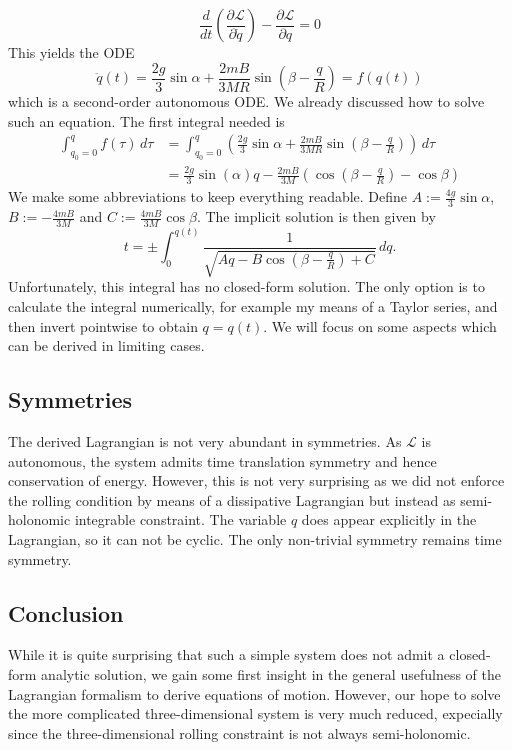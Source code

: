\begin{equation}
    \frac{d}{dt} \left( \frac{\partial \mathcal{L}}{\partial \dot{q}}\right) - \frac{\partial \mathcal{L}}{\partial q}= 0
\end{equation}
This yields the ODE \[
    \ddot{q}(t)= \frac{2g}{3} \sin \alpha  + \frac{2mB}{3MR}\sin\left(\beta - \frac{q}{R}\right) = f(q(t))
\] which is a second-order autonomous ODE. We already discussed how to solve such an equation. The first integral needed is
\begin{align*}
    \int_{q_0=0}^q f(\tau) \, d\tau &= \int_{q_0=0}^q \left( \frac{2g}{3}\sin \alpha + \frac{2mB}{3MR} \sin \left(\beta - \frac{q}{R} \right) \right)\, d\tau \\
                                  &= \frac{2g}{3}\sin(\alpha)q - \frac{2mB}{3M} \left( \cos\left(\beta - \frac{q}{R}\right)- \cos\beta\right)
\end{align*}
We make some abbreviations to keep everything readable. Define $A:= \frac{4g}{3} \sin \alpha$, $B := -\frac{4mB}{3M}$ and $C:=\frac{4mB}{3M} \cos \beta$. The implicit solution is then given by
\begin{equation}
t = \pm \int_0^{q(t)} \frac{1}{\sqrt{Aq - B \cos(\beta - \frac{q}{R}) + C}} \, dq.
\end{equation}
Unfortunately, this integral has no closed-form solution. The only option is to calculate the integral numerically, for example my means of a Taylor series, and then invert pointwise to obtain $q=q(t)$. We will focus on some aspects which can be derived in limiting cases.
\subsection*{Symmetries}
The derived Lagrangian is not very abundant in symmetries. As $\mathcal{L}$ is autonomous, the system admits time translation symmetry and hence conservation of energy. However, this is not very surprising as we did not enforce the rolling condition by means of a dissipative Lagrangian but instead as semi-holonomic integrable constraint. The variable $q$ does appear explicitly in the Lagrangian, so it can not be cyclic. The only non-trivial symmetry remains time symmetry. 

\subsection*{Conclusion}
While it is quite surprising that such a simple system does not admit a closed-form analytic solution, we gain some first insight in the general usefulness of the Lagrangian formalism to derive equations of motion. However, our hope to solve the more complicated three-dimensional system is very much reduced, expecially since the three-dimensional rolling constraint is not always semi-holonomic.

